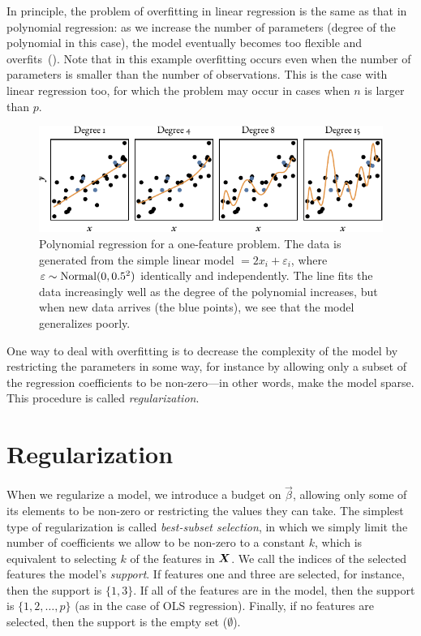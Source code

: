 
In principle, the problem of overfitting in linear regression is the same as that in polynomial regression: as we increase the number of parameters (degree of the polynomial in this case), the model eventually becomes too flexible and overfits~().
Note that in this example overfitting occurs even when the number of parameters is smaller than the number of observations. This is the case with linear regression too, for which the problem  may occur in cases when \(n\) is larger than \(p\).

\begin{figure}
  \centering
  \includegraphics[]{figures/polyfit.pdf}
  \caption{%
    Polynomial regression for a one-feature problem.
    The data is generated from the simple linear model \( = 2x_i + \varepsilon_i\),
    where \(\varepsilon \sim \operatorname{Normal}(0, 0.5^2)\) identically and independently.
    The line fits the data increasingly well as the degree of the polynomial increases, but when new data arrives (the blue points), we see that the model generalizes poorly.
  }
  \label{fig:polyfit}
\end{figure}

One way to deal with overfitting is to decrease the complexity of the model by restricting the parameters in some way, for instance by allowing only a subset of the regression coefficients to be non-zero---in other words, make the model sparse. This procedure is called \emph{regularization}.

\section{Regularization}

When we regularize a model, we introduce a budget on \(\vec{\beta}\), allowing only some of its elements to be non-zero or restricting the values they can take.
The simplest type of regularization is called \emph{best-subset selection}, in which we simply limit the number of coefficients we allow to be non-zero to a constant \(k\), which is equivalent to selecting \(k\) of the features in \(\boldsymbol{X}\). We call the indices of the selected features the model's \emph{support}. If features one and three are selected, for instance, then the support is \(\{1,3\}\). If all of the features are in the model, then the support is \(\{1,2,\dots,p\}\) (as in the case of OLS regression). Finally, if no features are selected, then the support is the empty set (\(\emptyset\)).


